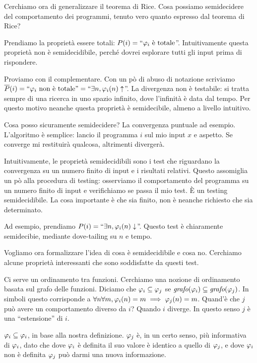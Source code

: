 Cerchiamo ora di generalizzare il teorema di Rice. Cosa possiamo semidecidere del comportamento dei
programmi, tenuto vero quanto espresso dal teorema di Rice?

Prendiamo la proprietà essere totali: $P(i) = ``\varphi_{i} \text{ è totale}$''. Intuitivamente questa proprietà non
è semidecidibile, perché dovrei esplorare tutti gli input prima di rispondere.

Proviamo con il complementare. Con un pò di abuso di notazione scriviamo $\overline{P}(i) = ``\varphi_{i}
\text{ non è totale''} = ``\exists n, \varphi_{i}(n) \uparrow$''. La divergenza non è testabile: si tratta
sempre di una ricerca in uno spazio infinito, dove l'infinità è data dal tempo. Per questo motivo
neanche questa proprietà è semidecibile, almeno a livello intuitivo.

Cosa posso sicuramente semidecidere? La convergenza puntuale ad esempio. L'algoritmo è semplice:
lancio il programma $i$ sul mio input $x$ e aspetto. Se converge mi restituirà qualcosa, altrimenti
divergerà.

Intuitivamente, le proprietà semidecidibili sono i test che riguardano la convergenza su un numero
finito di input e i risultati relativi. Questo assomiglia un pò alla procedura di testing:
osserviamo il comportamento del programma su un numero finito di input e verifichiamo se passa il
mio test. È un testing semidecidibile. La cosa importante è che sia finito, non è neanche
richiesto che sia determinato.

Ad esempio, prendiamo $P(i) = ``\exists n, \varphi_{i}(n) \downarrow$''. Questo test è chiaramente
semidecibie, mediante dove-tailing su $n$ e tempo.

Vogliamo ora formalizzare l'idea di cosa è semidecidibile e cosa no. Cerchiamo alcune proprietà
interessanti che sono soddisfatte da questi test.

Ci serve un ordinamento tra funzioni. Cerchiamo una nozione di ordinamento basata sul grafo delle
funzioni. Diciamo che $\varphi_{i} \subseteq \varphi_{j}$ se $\textit{grafo}(\varphi_{i}) \subseteq
\textit{grafo}(\varphi_{j})$. In simboli questo corrisponde a $\forall n \forall m, \varphi_{i}(n) = m \implies
\varphi_{j}(n) = m$. Quand'è che $j$ può avere un comportamento diverso da $i$? Quando $i$ diverge. In
questo senso $j$ è una ``estensione'' di $i$.

$\varphi_{i} \subseteq \varphi_{i}$, in base alla nostra definizione. $\varphi_{j}$ è, in un certo senso, più
informativa di $\varphi_{i}$, dato che dove $\varphi_{i}$ è definita il suo valore è identico a quello di
$\varphi_{j}$, e dove $\varphi_{i}$ non è definita $\varphi_{j}$ può darmi una nuova informazione.

